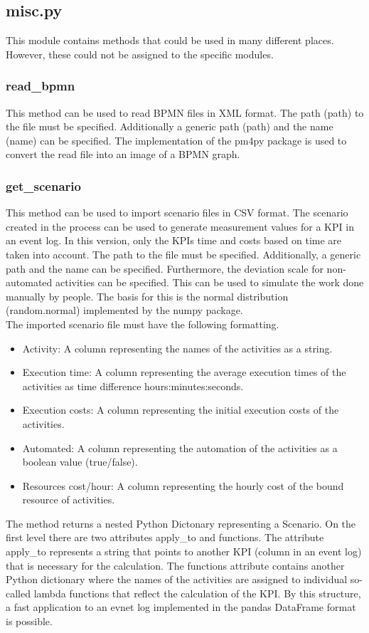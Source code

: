    \subsection{misc.py}
    This module contains methods that could be used in many different places. However, these could not be assigned to the specific modules.
            
    \subsubsection*{read\_bpmn}
    This method can be used to read BPMN files in XML format. The path (path) to the file must be specified. Additionally a generic path (path) and the name (name) can be specified. The implementation of the pm4py package is used to convert the read file into an image of a BPMN graph.\label{readbpmn}
    \subsubsection*{get\_scenario}
    This method can be used to import scenario files in CSV format. The scenario created in the process can be used to generate measurement values for a KPI in an event log. In this version, only the KPIs time and costs based on time are taken into account. The path to the file must be specified. Additionally, a generic path and the name can be specified. Furthermore, the deviation scale for non-automated activities can be specified. This can be used to simulate the work done manually by people. The basis for this is the normal distribution (random.normal) implemented by the numpy package.\\
    The imported scenario file must have the following formatting.
    \begin{itemize}
        \item Activity: A column representing the names of the activities as a string.
        \item Execution time: A column representing the average execution times of the activities as time difference hours:minutes:seconds.
        \item Execution costs: A column representing the initial execution costs of the activities.
        \item Automated: A column representing the automation of the activities as a boolean value (true/false).
        \item Resources cost/hour: A column representing the hourly cost of the bound resource of activities.
    \end{itemize}
    The method returns a nested Python Dictonary representing a Scenario. On the first level there are two attributes apply\_to and functions. The attribute apply\_to represents a string that points to another KPI (column in an event log) that is necessary for the calculation. The functions attribute contains another Python dictionary where the names of the activities are assigned to individual so-called lambda functions that reflect the calculation of the KPI. By this structure, a fast application to an evnet log implemented in the pandas DataFrame format is possible.\label{getscenario}

